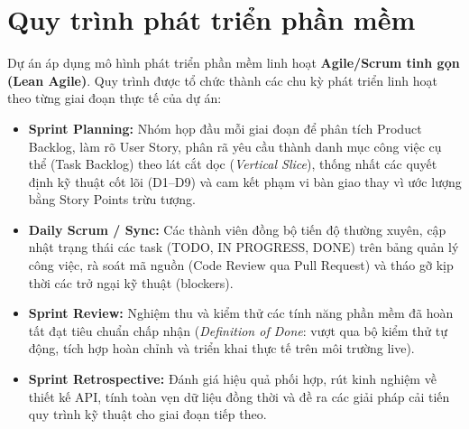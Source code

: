 \section{Quy trình phát triển phần mềm}
Dự án áp dụng mô hình phát triển phần mềm linh hoạt \textbf{Agile/Scrum tinh gọn (Lean Agile)}. Quy trình được tổ chức thành các chu kỳ phát triển linh hoạt theo từng giai đoạn thực tế của dự án:
\begin{itemize}
    \item \textbf{Sprint Planning:} Nhóm họp đầu mỗi giai đoạn để phân tích Product Backlog, làm rõ User Story, phân rã yêu cầu thành danh mục công việc cụ thể (Task Backlog) theo lát cắt dọc (\textit{Vertical Slice}), thống nhất các quyết định kỹ thuật cốt lõi (D1--D9) và cam kết phạm vi bàn giao thay vì ước lượng bằng Story Points trừu tượng.
    \item \textbf{Daily Scrum / Sync:} Các thành viên đồng bộ tiến độ thường xuyên, cập nhật trạng thái các task (TODO, IN PROGRESS, DONE) trên bảng quản lý công việc, rà soát mã nguồn (Code Review qua Pull Request) và tháo gỡ kịp thời các trở ngại kỹ thuật (blockers).
    \item \textbf{Sprint Review:} Nghiệm thu và kiểm thử các tính năng phần mềm đã hoàn tất đạt tiêu chuẩn chấp nhận (\textit{Definition of Done}: vượt qua bộ kiểm thử tự động, tích hợp hoàn chỉnh và triển khai thực tế trên môi trường live).
    \item \textbf{Sprint Retrospective:} Đánh giá hiệu quả phối hợp, rút kinh nghiệm về thiết kế API, tính toàn vẹn dữ liệu đồng thời và đề ra các giải pháp cải tiến quy trình kỹ thuật cho giai đoạn tiếp theo.
\end{itemize}

